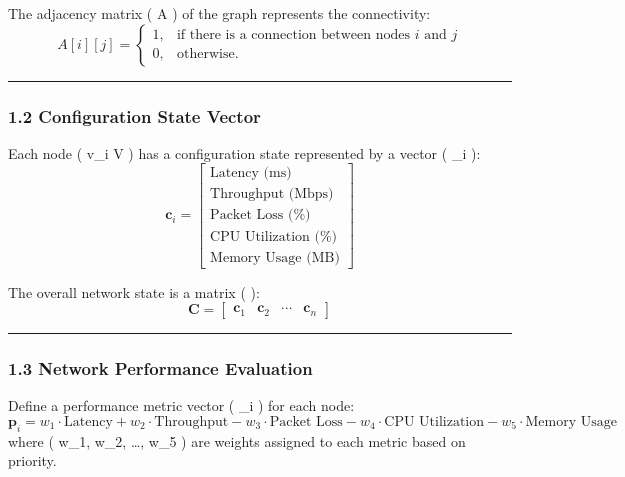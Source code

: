 \documentclass[11pt]{article}
\begin{document}
The adjacency matrix ( A ) of the graph represents the connectivity: \[
A[i][j] =
\begin{cases}
1, & \text{if there is a connection between nodes } i \text{ and } j \\
0, & \text{otherwise}.
\end{cases}
\]

\begin{center}\rule{0.5\linewidth}{0.5pt}\end{center}

\hypertarget{configuration-state-vector}{%
\subsubsection{\texorpdfstring{\textbf{1.2 Configuration State
Vector}}{1.2 Configuration State Vector}}\label{configuration-state-vector}}

Each node ( v\_i \in V ) has a configuration state represented by a
vector ( \_i ): \[
\mathbf{c}_i = 
\begin{bmatrix}
\text{Latency (ms)} \\
\text{Throughput (Mbps)} \\
\text{Packet Loss (\%)} \\
\text{CPU Utilization (\%)} \\
\text{Memory Usage (MB)}
\end{bmatrix}
\]

The overall network state is a matrix (  ): \[
\mathbf{C} =
\begin{bmatrix}
\mathbf{c}_1 & \mathbf{c}_2 & \cdots & \mathbf{c}_n
\end{bmatrix}
\]

\begin{center}\rule{0.5\linewidth}{0.5pt}\end{center}

\hypertarget{network-performance-evaluation}{%
\subsubsection{\texorpdfstring{\textbf{1.3 Network Performance
Evaluation}}{1.3 Network Performance Evaluation}}\label{network-performance-evaluation}}

Define a performance metric vector ( \_i ) for each node: \[
\mathbf{p}_i = w_1 \cdot \text{Latency} + w_2 \cdot \text{Throughput} - w_3 \cdot \text{Packet Loss} - w_4 \cdot \text{CPU Utilization} - w_5 \cdot \text{Memory Usage}
\] where ( w\_1, w\_2, \dots, w\_5 ) are weights assigned to each metric
based on priority.
\end{document}
